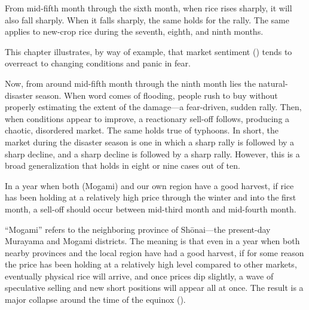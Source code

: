 
\begin{sokyubox}
{\small\itshape\color{sokyubar} }

\medskip
From mid-fifth month through the sixth month, when rice rises
sharply, it will also fall sharply. When it falls sharply, the
same holds for the rally. The same applies to new-crop rice during
the seventh, eighth, and ninth months.
\end{sokyubox}

\commentary
This chapter illustrates, by way of example, that market sentiment
() tends to overreact to changing conditions and
panic in fear.

Now, from around mid-fifth month through the ninth month lies the
natural-disaster season. When word comes of flooding, people rush
to buy without properly estimating the extent of the damage---a
fear-driven, sudden rally. Then, when conditions appear to improve,
a reactionary sell-off follows, producing a chaotic, disordered
market. The same holds true of typhoons. In short, the market
during the disaster season is one in which a sharp rally is
followed by a sharp decline, and a sharp decline is followed by a
sharp rally. However, this is a broad generalization that holds in
eight or nine cases out of ten.


\begin{sokyubox}
{\small\itshape\color{sokyubar} }

\medskip
In a year when both  (Mogami) and our own region
have a good harvest, if rice has been holding at a relatively high
price through the winter and into the first month, a sell-off
should occur between mid-third month and mid-fourth month.
\end{sokyubox}

\commentary
``Mogami'' refers to the neighboring province of Sh\=onai---the
present-day Murayama and Mogami districts. The meaning is that
even in a year when both nearby provinces and the local region have
had a good harvest, if for some reason the price has been holding
at a relatively high level compared to other markets, eventually
physical rice will arrive, and once prices dip slightly, a wave of
speculative selling and new short positions will appear all at
once. The result is a major collapse around the time of the
equinox ().

